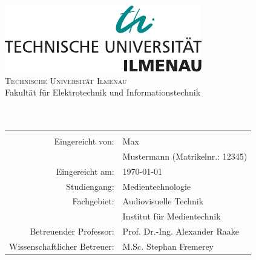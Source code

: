 %
%
%
%

\begin{titlepage}
	\centering
	\includegraphics[scale=0.5]{images/logo}\\[3ex]
	{\Large \textsc{Technische Universität Ilmenau}}\\[3ex]
	{\Large Fakultät für Elektrotechnik und Informationstechnik}\\[3ex]
	\vfill
	{\Large \textbf{\artderausarbeitung}}\\[4ex]
	{\large \textbf{\themaderarbeit}}\\[4ex]
	\vfill
	\begin{tabular}{rl}
		\hline\\
		Eingereicht von:          & \quad Max\\[1.5ex]
								  & \quad Mustermann (Matrikelnr.: 12345)\\[1,5ex]
		Eingereicht am:         & \quad \today\\[1,5ex]
		Studiengang:            & \quad Medientechnologie\\[1,5ex]
		Fachgebiet:
		& \quad Audiovisuelle Technik\\[1,5ex]
		& \quad Institut für Medientechnik\\[1,5ex]
		Betreuender Professor:
		& \quad Prof. Dr.-Ing. Alexander Raake \\[1,5ex]
		Wissenschaftlicher Betreuer:
		& \quad M.Sc. Stephan Fremerey
	\end{tabular}
	\vfill
\end{titlepage}

